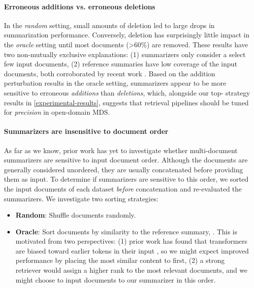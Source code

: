 \documentclass[11pt]{article}
\begin{document}
\paragraph{Erroneous additions vs. erroneous deletions}
In the \textit{random} setting, small amounts of deletion led to large drops in summarization performance. Conversely, deletion has surprisingly little impact in the \textit{oracle} setting until most documents (>60\%) are removed.
These results have two non-mutually exclusive explanations: (1) summarizers only consider a select few input documents, (2) reference summaries have low coverage of the input documents, both corroborated by recent work \citep{https://doi.org/10.48550/arxiv.2210.12688}. Based on the addition perturbation results in the oracle setting, summarizers appear to be more sensitive to erroneous \textit{additions} than \textit{deletions}, which, alongside our top- strategy results in \textsection \ref{experimental-results}, suggests that retrieval pipelines should be tuned for \textit{precision} in open-domain MDS.
\vspace{-5.0mm}

\paragraph{Summarizers are insensitive to document order} \label{sorting} As far as we know, prior work has yet to investigate whether multi-document summarizers are sensitive to input document order. Although the documents are generally considered unordered, they are usually concatenated before providing them as input. To determine if summarizers are sensitive to this order, we sorted the input documents of each dataset \textit{before} concatenation and re-evaluated the summarizers. We investigate two sorting strategies:

\begin{itemize}[itemsep=0.2pt, topsep=3pt, leftmargin=10pt]
    \item \textbf{Random}: Shuffle documents randomly.
    \item \textbf{Oracle}: Sort documents by similarity to the reference summary, . This is motivated from two perspectives: (1) prior work has found that transformers are biased toward earlier tokens in their input \citep{Hofsttter2021MitigatingTP}, so we might expect improved performance by placing the most similar content to  first, (2) a strong retriever would assign a higher rank to the most relevant documents, and we might choose to input documents to our summarizer in this order. 
\end{itemize}
\end{document}
